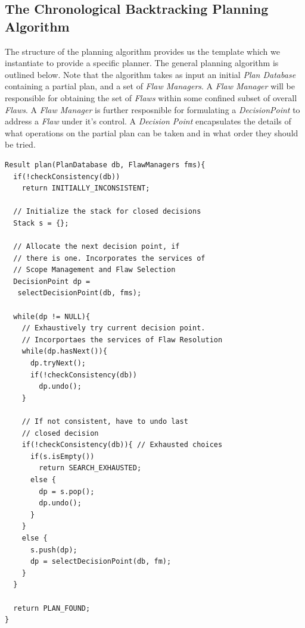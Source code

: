 \documentclass[10pt, letterpaper, oneside]{article}
\begin{document}
\subsection{The Chronological Backtracking Planning Algorithm}
The structure of the planning algorithm provides us the template which we instantiate to provide a specific planner. The general planning algorithm is outlined below. Note that the algorithm takes as input an initial {\em Plan Database} containing a partial plan, and a set of {\em Flaw Managers}. A {\em Flaw Manager} will be responsible for obtaining the set of {\em Flaws} within some confined subset of overall {\em Flaws}. A {\em Flaw Manager} is further resposnible for formulating a {\em DecisionPoint} to address a {\em Flaw} under it's control. A {\em Decision Point} encapsulates the details of what operations on the partial plan can be taken and in what order they should be tried.
\begin{verbatim}
Result plan(PlanDatabase db, FlawManagers fms){
  if(!checkConsistency(db))
    return INITIALLY_INCONSISTENT;

  // Initialize the stack for closed decisions
  Stack s = {};

  // Allocate the next decision point, if
  // there is one. Incorporates the services of
  // Scope Management and Flaw Selection
  DecisionPoint dp = 
   selectDecisionPoint(db, fms);

  while(dp != NULL){
    // Exhaustively try current decision point.
    // Incorportaes the services of Flaw Resolution
    while(dp.hasNext()){
      dp.tryNext();
      if(!checkConsistency(db))
        dp.undo();
    }

    // If not consistent, have to undo last
    // closed decision
    if(!checkConsistency(db)){ // Exhausted choices
      if(s.isEmpty())
        return SEARCH_EXHAUSTED;
      else {
        dp = s.pop();
        dp.undo();
      }
    }
    else {
      s.push(dp);
      dp = selectDecisionPoint(db, fm);
    }
  }

  return PLAN_FOUND;
}
\end{verbatim}
\end{document}
